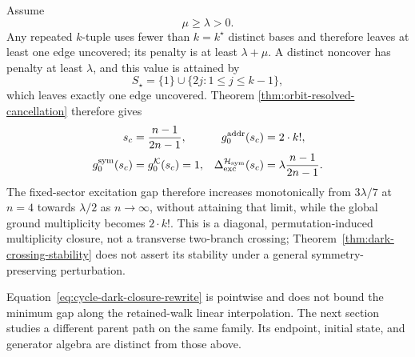 Assume
\begin{equation}
 \mu\geq\lambda>0.
 \label{eq:cycle-penalty-hypothesis}
\end{equation}
Any repeated $k$-tuple uses fewer than $k=k^\star$ distinct bases and
therefore leaves at least one edge uncovered; its penalty is at least
$\lambda+\mu$.  A distinct noncover has penalty at least $\lambda$, and
this value is attained by
\begin{equation}
 S_\star=\{1\}\cup\{2j:1\leq j\leq k-1\},
\end{equation}
which leaves exactly one edge uncovered.  Theorem
\ref{thm:orbit-resolved-cancellation} therefore gives
\begin{align}
 s_c&=\frac{n-1}{2n-1},&
 g_0^{\rm addr}(s_c)&=2\cdot k!,\\
 g_0^{\rm sym}(s_c)&=g_0^{\mathcal K}(s_c)=1,&
 \Delta_{\rm exc}^{\mathcal H_{\rm sym}}(s_c)
 &=\lambda\frac{n-1}{2n-1}.
 \label{eq:cycle-dark-closure-rewrite}
\end{align}
The fixed-sector excitation gap therefore increases monotonically from
$3\lambda/7$ at $n=4$ towards $\lambda/2$ as $n\to\infty$, without
attaining that limit, while the global ground
multiplicity becomes $2\cdot k!$.  This is a diagonal,
permutation-induced multiplicity closure, not a transverse two-branch
crossing; Theorem~\ref{thm:dark-crossing-stability} does not assert its
stability under a general symmetry-preserving perturbation.

Equation~\eqref{eq:cycle-dark-closure-rewrite} is pointwise and does not
bound the minimum gap along the retained-walk linear interpolation.  The next
section studies a different parent path on the same family.  Its endpoint,
initial state, and generator algebra are distinct from those above.
